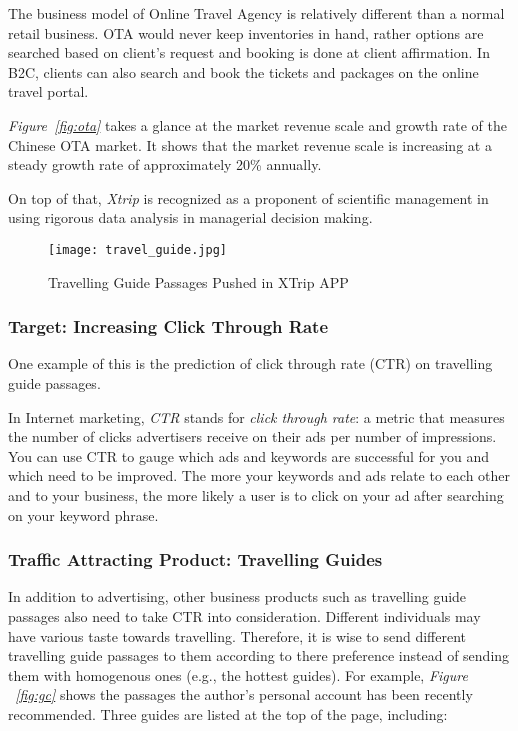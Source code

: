 \documentclass{article}
\begin{document}
	The business model of Online Travel Agency is relatively different than a normal retail business. OTA would never keep inventories in hand, rather options are searched based on client’s request and booking is done at client affirmation. In B2C, clients can also search and book the tickets and packages on the online travel portal. 

	\emph{Figure~\ref{fig:ota}} takes a glance at the market revenue scale and growth rate of the Chinese OTA market. It shows that the market revenue scale is increasing at a steady growth rate of approximately 20\% annually.

    On top of that, \emph{Xtrip} is recognized as a proponent of scientific management in using rigorous data analysis in managerial decision making. 

    \begin{figure}[!h]
		\centering
		\texttt{[image: travel\_guide.jpg]}
		\caption{\small{Travelling Guide Passages Pushed in XTrip APP}}
		\label{fig:bb}
	\end{figure}

    \subsubsection{Target: Increasing Click Through Rate}
    \label{sec:ctr}
	One example of this is the prediction of click through rate (CTR) on travelling guide passages. 

	In Internet marketing, \emph{CTR} stands for \emph{click through rate}: a metric that measures the number of clicks advertisers receive on their ads per number of impressions. You can use CTR to gauge which ads and keywords are successful for you and which need to be improved. The more your keywords and ads relate to each other and to your business, the more likely a user is to click on your ad after searching on your keyword phrase.

    \subsubsection{Traffic Attracting Product: Travelling Guides}
    \label{sec:tg}

	In addition to advertising, other business products such as travelling guide passages also need to take CTR into consideration. Different individuals may have various taste towards travelling. Therefore, it is wise to send different travelling guide passages to them according to there preference instead of sending them with homogenous ones (e.g., the hottest guides). For example, \emph{Figure ~\ref{fig:gc}} shows the passages the author's personal account has been recently recommended. Three guides are listed at the top of the page, including: 
\end{document}
